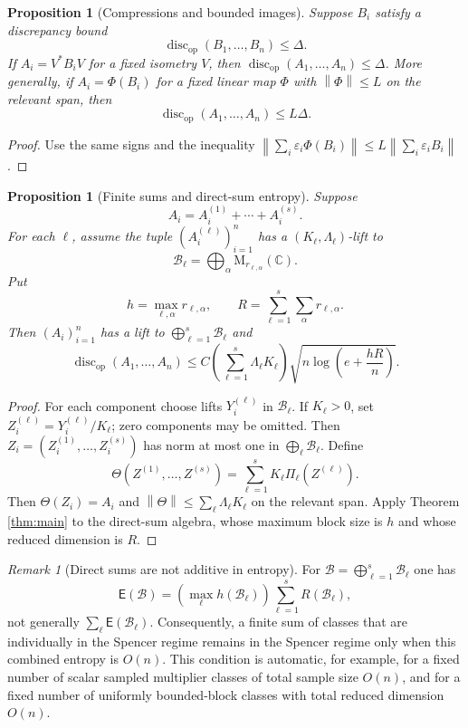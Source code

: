 \documentclass[11pt]{amsart}
\numberwithin{equation}{section}
\newtheorem{proposition}[theorem]{Proposition}
\theoremstyle{definition}
\theoremstyle{remark}
\newtheorem{remark}[theorem]{Remark}
\newcommand{\C}{\mathbb C}
\newcommand{\M}{\mathrm M}
\newcommand{\op}{\mathrm{op}}
\newcommand{\discop}{\operatorname{disc}_{\op}}
\newcommand{\Ent}{\mathsf E}
\newcommand{\norm}[1]{\left\lVert #1\right\rVert}
\newcommand{\eps}{\varepsilon}
\newcommand{\mcB}{\mathcal B}
\begin{document}
\begin{proposition}[Compressions and bounded images]\label{prop:comp}
Suppose $B_i$ satisfy a discrepancy bound
\[
\discop(B_1,\ldots,B_n)\le \Delta .
\]
If $A_i=V^*B_iV$ for a fixed isometry $V$, then
$\discop(A_1,\ldots,A_n)\le\Delta$. More generally, if
$A_i=\Phi(B_i)$ for a fixed linear map $\Phi$ with $\norm\Phi\le L$ on the
relevant span, then
\[
\discop(A_1,\ldots,A_n)
\le L\Delta .
\]
\end{proposition}

\begin{proof}
Use the same signs and the inequality
$\norm{\sum_i\eps_i\Phi(B_i)}\le L\norm{\sum_i\eps_iB_i}$.
\end{proof}

\begin{proposition}[Finite sums and direct-sum entropy]\label{prop:sums}
Suppose
\[
A_i=A_i^{(1)}+\cdots+A_i^{(s)} .
\]
For each $\ell$, assume the tuple $(A_i^{(\ell)})_{i=1}^n$ has a
$(K_\ell,\Lambda_\ell)$-lift to
\[
\mcB_\ell=\bigoplus_\alpha \M_{r_{\ell,\alpha}}(\C).
\]
Put
\[
h=\max_{\ell,\alpha} r_{\ell,\alpha},
\qquad
R=\sum_{\ell=1}^s\sum_\alpha r_{\ell,\alpha} .
\]
Then $(A_i)_{i=1}^n$ has a lift to $\bigoplus_{\ell=1}^s\mcB_\ell$ and
\[
\discop(A_1,\ldots,A_n)
\le C\left(\sum_{\ell=1}^s\Lambda_\ell K_\ell\right)
\sqrt{n\log\left(e+\frac{hR}{n}\right)} .
\]
\end{proposition}

\begin{proof}
For each component choose lifts $Y_i^{(\ell)}$ in $\mcB_\ell$. If $K_\ell>0$,
set $Z_i^{(\ell)}=Y_i^{(\ell)}/K_\ell$; zero components may be omitted. Then
$Z_i=(Z_i^{(1)},\ldots,Z_i^{(s)})$ has norm at most one in
$\bigoplus_\ell\mcB_\ell$. Define
\[
\Theta(Z^{(1)},\ldots,Z^{(s)})
=\sum_{\ell=1}^s K_\ell\Pi_\ell(Z^{(\ell)}).
\]
Then $\Theta(Z_i)=A_i$ and
$\norm{\Theta}\le\sum_\ell\Lambda_\ell K_\ell$ on the relevant span. Apply
Theorem \ref{thm:main} to the direct-sum algebra, whose maximum block
size is $h$ and whose reduced dimension is $R$.
\end{proof}

\begin{remark}[Direct sums are not additive in entropy]\label{rem:nonadd}
For $\mcB=\bigoplus_{\ell=1}^s\mcB_\ell$ one has
\[
\Ent(\mcB)=\left(\max_\ell h(\mcB_\ell)\right)
\sum_{\ell=1}^s R(\mcB_\ell),
\]
not generally $\sum_\ell\Ent(\mcB_\ell)$. Consequently, a finite sum of classes
that are individually in the Spencer regime remains in the Spencer regime only
when this combined entropy is $O(n)$. This condition is automatic, for example,
for a fixed number of scalar sampled multiplier classes of total sample size
$O(n)$, and for a fixed number of uniformly bounded-block classes with total
reduced dimension $O(n)$.
\end{remark}
\end{document}
